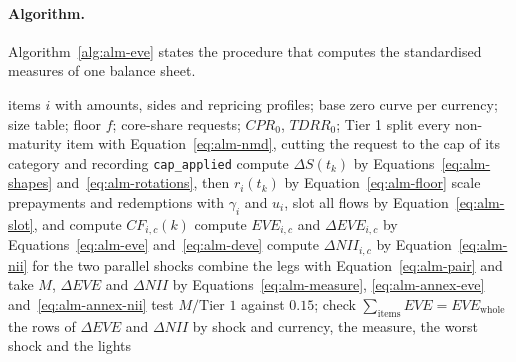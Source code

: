 

\paragraph{Algorithm.}
Algorithm~\ref{alg:alm-eve} states the procedure that computes the standardised measures of one balance sheet.
\begin{algorithm}[htbp]
\caption{Standardised economic value and net interest income of one balance sheet under the six shocks.}
\label{alg:alm-eve}
\begin{algorithmic}[1]
\Require items $i$ with amounts, sides and repricing profiles; base zero curve per currency; size table; floor $f$; core-share requests; $CPR_0$, $TDRR_0$; Tier 1
\State split every non-maturity item with Equation~\ref{eq:alm-nmd}, cutting the request to the cap of its category and recording \texttt{cap\_applied}
  \State compute $\Delta S(t_k)$ by Equations~\ref{eq:alm-shapes} and~\ref{eq:alm-rotations}, then $r_i(t_k)$ by Equation~\ref{eq:alm-floor}
  \State scale prepayments and redemptions with $\gamma_i$ and $u_i$, slot all flows by Equation~\ref{eq:alm-slot}, and compute $CF_{i,c}(k)$
  \State compute $EVE_{i,c}$ and $\Delta EVE_{i,c}$ by Equations~\ref{eq:alm-eve} and~\ref{eq:alm-deve}
\EndFor
\State compute $\Delta NII_{i,c}$ by Equation~\ref{eq:alm-nii} for the two parallel shocks
\State combine the legs with Equation~\ref{eq:alm-pair} and take $M$, $\Delta EVE$ and $\Delta NII$ by Equations~\ref{eq:alm-measure}, \ref{eq:alm-annex-eve} and~\ref{eq:alm-annex-nii}
\State test $M/\text{Tier 1}$ against $0.15$; check $\sum_{\text{items}}EVE=EVE_{\text{whole}}$
\State \Return the rows of $\Delta EVE$ and $\Delta NII$ by shock and currency, the measure, the worst shock and the lights
\end{algorithmic}
\end{algorithm}

